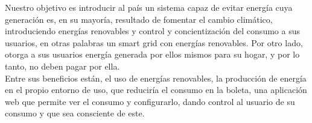Nuestro objetivo es introducir al país un sistema capaz de evitar energía cuya generación es, en su mayoría, resultado de fomentar el cambio climático, introduciendo energías renovables y control y concientización del consumo a sus usuarios, en otras palabras un smart grid con energías renovables. Por otro lado, otorga a sus usuarios energía generada por ellos mismos para su hogar, y por lo tanto, no deben pagar por ella. \\

Entre sus beneficios están, el uso de energías renovables, la producción de energía en el propio entorno de uso, que reduciría el consumo en la boleta, una aplicación web que permite ver el consumo y configurarlo, dando control al usuario de su consumo y que sea consciente de este. 